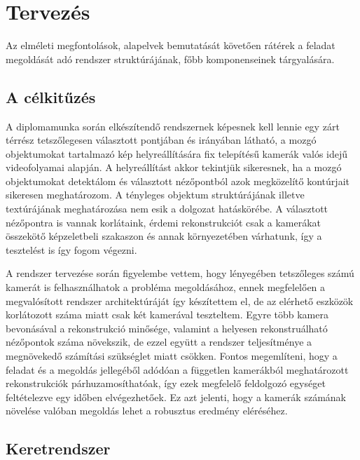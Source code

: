 \chapter{Tervezés \label{chapter3}}

Az elméleti megfontolások, alapelvek bemutatását követően rátérek a feladat megoldását adó rendszer struktúrájának, főbb komponenseinek tárgyalására.

\section{A célkitűzés}

A diplomamunka során elkészítendő rendszernek képesnek kell lennie egy zárt térrész tetszőlegesen választott pontjában és irányában látható, a mozgó objektumokat tartalmazó kép helyreállítására fix telepítésű kamerák valós idejű videofolyamai alapján. A helyreállítást akkor tekintjük sikeresnek, ha a mozgó objektumokat detektálom és választott nézőpontból azok megközelítő kontúrjait sikeresen meghatározom. A tényleges objektum struktúrájának illetve textúrájának meghatározása nem esik a dolgozat hatáskörébe. A választott nézőpontra is vannak korlátaink, érdemi rekonstrukciót csak a kamerákat összekötő képzeletbeli szakaszon és annak környezetében várhatunk, így a tesztelést is így fogom végezni.

A rendszer tervezése során figyelembe vettem, hogy lényegében tetszőleges számú kamerát is felhasználhatok a probléma megoldásához, ennek megfelelően a megvalósított rendszer architektúráját így készítettem el, de az elérhető eszközök korlátozott száma miatt csak két kamerával teszteltem. Egyre több kamera bevonásával a rekonstrukció minősége, valamint a helyesen rekonstruálható nézőpontok száma növekszik, de ezzel együtt a rendszer teljesítménye a megnövekedő számítási szükséglet miatt csökken. Fontos megemlíteni, hogy a feladat és a megoldás jellegéből adódóan a független kamerákból meghatározott rekonstrukciók párhuzamosíthatóak, így ezek megfelelő feldolgozó egységet feltételezve egy időben elvégezhetőek. Ez azt jelenti, hogy a kamerák számának növelése valóban megoldás lehet a robusztus eredmény eléréséhez.

\section{Keretrendszer}

